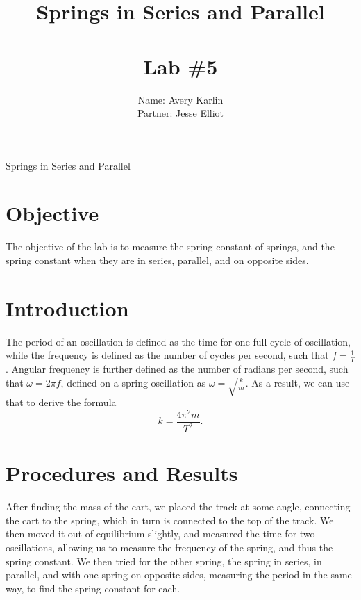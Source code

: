 \documentclass[11pt, titlepage]{article}
\title{Springs in Series and Parallel\\ \ \\ \large Lab \#5}
\author{Name: Avery Karlin \\ Partner: Jesse Elliot}
\date{}
\begin{document}
\maketitle

\begin{center}
\LARGE Springs in Series and Parallel
\end{center}

\section*{Objective}
The objective of the lab is to measure the spring constant of springs, and the spring constant when they are in series, parallel, and on opposite sides.

\section*{Introduction}
The period of an oscillation is defined as the time for one full cycle of oscillation, while the frequency is defined as the number of cycles per second, such that $f = \frac{1}{T}$. Angular frequency is further defined as the number of radians per second, such that $\omega = 2\pi f$, defined on a spring oscillation as $\omega = \sqrt{\frac{k}{m}}$. As a result, we can use that to derive the formula $$k = \frac{4\pi^2m}{T^2}.$$

\section*{Procedures and Results}
After finding the mass of the cart, we placed the track at some angle, connecting the cart to the spring, which in turn is connected to the top of the track. We then moved it out of equilibrium slightly, and measured the time for two oscillations, allowing us to measure the frequency of the spring, and thus the spring constant. We then tried for the other spring, the spring in series, in parallel, and with one spring on opposite sides, measuring the period in the same way, to find the spring constant for each. 
\end{document}
